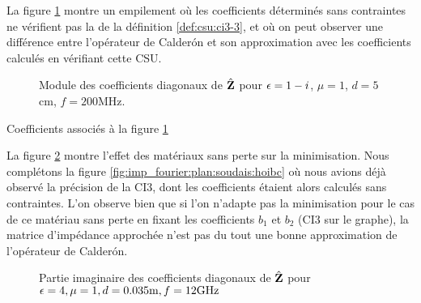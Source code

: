   La figure \ref{fig:imp_fourier:plan:stupfel:hoibc_vs_csu} montre un empilement où les coefficients déterminés sans contraintes ne vérifient pas la  de la définition \ref{def:csu:ci3-3}, et où on peut observer une différence entre l'opérateur de Calderón et son approximation avec les coefficients calculés en vérifiant cette CSU.

  \begin{figure}[!hbt]
    \centering
    
    \caption[Module de la matrice d'impédance pour le matériau M1, perte de précision à cause de la CSU]{ Module des coefficients diagonaux de \(\hat{\mathbf{Z}}\) pour \(\epsilon = 1-i\), \(\mu = 1\), \(d=5\)cm, \(f=200\)MHz.}
    \label{fig:imp_fourier:plan:stupfel:hoibc_vs_csu}
  \end{figure}

  \begin{table}[!hbt]
    \centering

    \caption{Coefficients associés à la figure \ref{fig:imp_fourier:plan:stupfel:hoibc_vs_csu}}
    \label{tab:imp_fourier:plan:stupfel:hoibc_vs_csu}
  \end{table}

  \FloatBarrier

  La figure \ref{fig:imp_fourier:plan:soudais:hoibc_csu} montre l'effet des matériaux sans perte sur la minimisation.
  Nous complétons la figure \ref{fig:imp_fourier:plan:soudais:hoibc} où nous avions déjà observé la précision de la CI3, dont les coefficients étaient alors calculés sans contraintes.
  L'on observe bien que si l'on n'adapte pas la minimisation pour le cas de ce matériau sans perte en fixant les coefficients \(b_1\) et \(b_2\) (CI3 sur le graphe), la matrice d'impédance approchée n'est pas du tout une bonne approximation de l'opérateur de Calderón.

  \begin{figure}[!hbt]
    \centering
    
    \caption[Partie imaginaire de l'opérateur de Calderón, comparé avec les approximations CI0, CI3, CI3 avec CSU, CI3 avec CSU adaptée pour une couche plane de matériau sans pertes de P.~Soudais]{Partie imaginaire des coefficients diagonaux de \(\hat{\mathbf{Z}}\) pour \(\epsilon = 4, \mu = 1, d=0.035\text{m}, f=12\text{GHz}\)}
    \label{fig:imp_fourier:plan:soudais:hoibc_csu}
  \end{figure}

